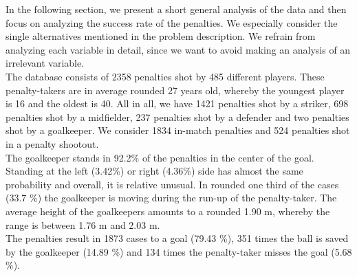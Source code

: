 \documentclass[12pt,dvipsnames]{article}%
\begin{document}
In the following section, we present a short general analysis of the data and then focus on analyzing the success rate of the penalties. We especially consider the single alternatives mentioned in the problem description. We refrain from analyzing each variable in detail, since we want to avoid making an analysis of an irrelevant variable. \\
The database consists of 2358 penalties shot by 485 different players. These penalty-takers are in average rounded 27 years old, whereby the youngest player is 16 and the oldest is 40. All in all, we have 1421 penalties shot by a striker, 698 penalties shot by a midfielder, 237 penalties shot by a defender and two penalties shot by a goalkeeper. We consider 1834 in-match penalties and 524 penalties shot in a penalty shootout. \\
The goalkeeper stands in 92.2\% of the penalties in the center of the goal. Standing at the left (3.42\%) or right (4.36\%) side has almost the same probability and overall, it is relative unusual. In rounded one third of the cases (33.7 \%) the goalkeeper is moving during the run-up of the penalty-taker. The average height of the goalkeepers amounts to a rounded 1.90 m, whereby the range is between 1.76 m and 2.03 m. \\
The penalties result in 1873 cases to a goal (79.43 \%), 351 times the ball is saved by the goalkeeper (14.89 \%) and 134 times the penalty-taker misses the goal (5.68 \%). 

\vspace{0.1cm}
\end{document}
